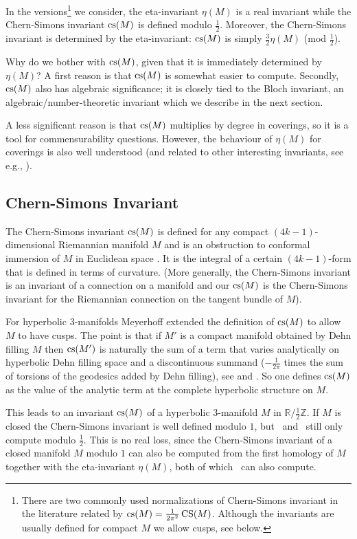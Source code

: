 \documentclass[a4paper]{amsart}
\def\Z{{\mathbb Z}}
\def\R{{\mathbb R}}
\theoremstyle{definition}
\begin{document}
In the versions\footnote{There are two commonly used normalizations of
Chern-Simons invariant in the literature related by
$\operatorname{cs}(M)=\frac1{2\pi^2}\operatorname{CS}(M)$. Although the invariants are usually
defined for compact $M$ we allow cusps, see below.} we consider, the
eta-invariant $\eta(M)$ is a real invariant while the Chern-Simons
invariant $\operatorname{cs}(M)$ is defined modulo $\frac12$.  Moreover, the
Chern-Simons invariant is determined by the eta-invariant: $\operatorname{cs}(M)$ is
simply $\frac32\eta(M)$ (mod $\frac12$).

Why do we bother with $\operatorname{cs}(M)$, given that it is immediately determined by
$\eta(M)$?  A first reason is that $\operatorname{cs}(M)$ is somewhat easier to
compute. Secondly, $\operatorname{cs}(M)$ also has algebraic significance; it is
closely tied to the Bloch invariant, an algebraic/number-theoretic
invariant which we describe in the next section.

A less significant reason is that $\operatorname{cs}(M)$ multiplies by degree in
coverings, so it is a tool for commensurability questions. However, the
behaviour of $\eta(M)$ for coverings is also well understood (and
related to other interesting invariants, see e.g.,
\cite{atiyah-patodi-singer2, neumann1}).

\subsection{Chern-Simons Invariant}

The Chern-Simons invariant $\operatorname{cs}(M)$ is defined for any compact
$(4k-1)$-dimensional Riemannian manifold $M$ and is an obstruction to
conformal immersion of $M$ in Euclidean space \cite{chern-simons}. It
is the integral of a certain $(4k-1)$-form that is defined in terms of
curvature. (More generally, the Chern-Simons invariant is an invariant
of a connection on a manifold and our $\operatorname{cs}(M)$ is the Chern-Simons
invariant for the Riemannian connection on the tangent bundle of $M$).

For hyperbolic 3-manifolds Meyerhoff \cite{meyerhoff} extended the
definition of $\operatorname{cs}(M)$ to allow $M$ to have cusps. The point is that
if $M'$ is a compact manifold obtained by Dehn filling $M$ then
$\operatorname{cs}(M')$ is naturally the sum of a term that varies analytically on
hyperbolic Dehn filling space and a discontinuous summand
($-\frac1{2\pi}$ times the sum of torsions of the geodesics added by Dehn
filling), see \cite{nz} and \cite{yoshida}. So one defines
$\operatorname{cs}(M)$ as the value of the analytic term at the complete hyperbolic
structure on $M$.

This leads to an invariant $\operatorname{cs}(M)$ of a hyperbolic 3-manifold $M$ in
$\R/\frac12\Z$. If $M$ is closed the Chern-Simons invariant is well
defined modulo $1$, but \snap\ and \snappea\ still only compute modulo
$\frac12$.  This is no real loss, since the Chern-Simons invariant of
a closed manifold $M$ modulo $1$ can also be computed from the first
homology of $M$ together with the eta-invariant $\eta(M)$, both of
which \snap\ can also compute.
\end{document}
